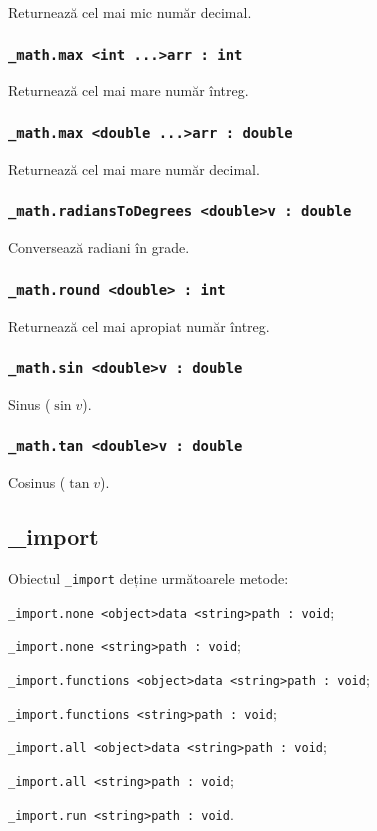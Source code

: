 Returnează cel mai mic număr decimal.

\subsubsection{\lstinline|_math.max <int ...>arr : int|}

Returnează cel mai mare număr întreg.

\subsubsection{\lstinline|_math.max <double ...>arr : double|}

Returnează cel mai mare număr decimal.

\subsubsection{\lstinline|_math.radiansToDegrees <double>v : double|}

Conversează radiani în grade.

\subsubsection{\lstinline|_math.round <double> : int|}

Returnează cel mai apropiat număr întreg.

\subsubsection{\lstinline|_math.sin <double>v : double|}

Sinus ($\sin{v}$).

\subsubsection{\lstinline|_math.tan <double>v : double|}

Cosinus ($\tan{v}$).

\subsection{{\color{orange} \_import}}

Obiectul \lstinline|_import| deține următoarele metode:
\begin{icItems}
	\item \lstinline|_import.none <object>data <string>path : void|;
	\item \lstinline|_import.none <string>path : void|;
	\item \lstinline|_import.functions <object>data <string>path : void|;
	\item \lstinline|_import.functions <string>path : void|;
	\item \lstinline|_import.all <object>data <string>path : void|;
	\item \lstinline|_import.all <string>path : void|;
	\item \lstinline|_import.run <string>path : void|.
\end{icItems}

